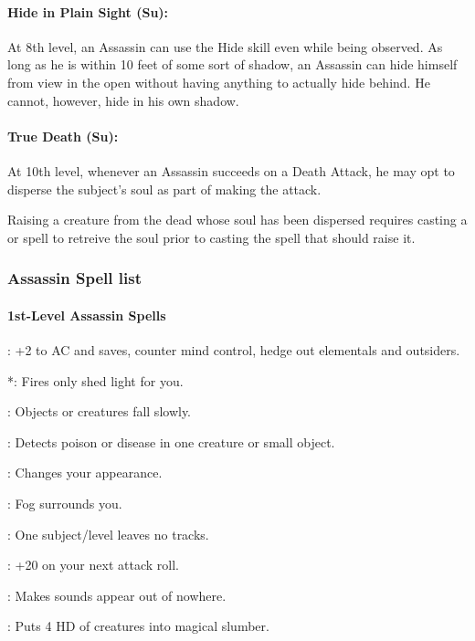 \paragraph{Hide in Plain Sight (Su):}
At 8th level, an Assassin can use the Hide skill even while being observed. 
As long as he is within 10 feet of some sort of shadow, an Assassin can hide himself from view in the open without having anything to actually hide behind. 
He cannot, however, hide in his own shadow.

\paragraph{True Death (Su):}
At 10th level, whenever an Assassin succeeds on a Death Attack, he may opt to disperse the subject's soul as part of making the attack.

Raising a creature from the dead whose soul has been dispersed requires casting a  or  
spell to retreive the soul prior to casting the spell that should raise it.

\subsubsection{Assassin Spell list}
\paragraph{1st-Level Assassin Spells}
\begin{list}{}{\leftmargin=1em}
\item {}: +2 to AC and saves, counter mind control, hedge out elementals and outsiders.
\item {}*: Fires only shed light for you.
\item {}: Objects or creatures fall slowly.
\item {}: Detects poison or disease in one creature or small object.
\item {}: Changes your appearance.
\item {}: Fog surrounds you.
\item {}: One subject/level leaves no tracks.
\item {}: +20 on your next attack roll.
\item {}: Makes sounds appear out of nowhere.
\item {}: Puts 4 HD of creatures into magical slumber.
\end{list}
